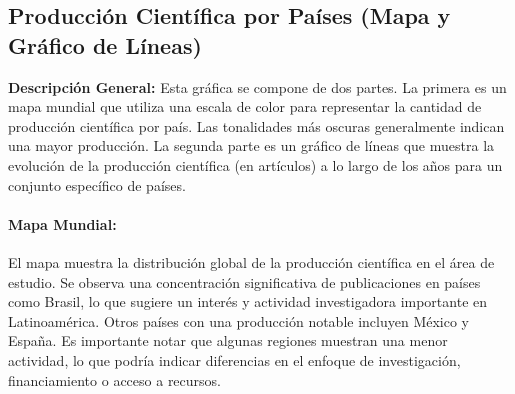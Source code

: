 \subsection{Producción Científica por Países (Mapa y Gráfico de Líneas) }
 
 \textbf{Descripción General:} Esta gráfica se compone de dos partes. La primera es un mapa mundial que utiliza una escala de color para representar la cantidad de producción científica por país. Las tonalidades más oscuras generalmente indican una mayor producción. La segunda parte es un gráfico de líneas que muestra la evolución de la producción científica (en artículos) a lo largo de los años para un conjunto específico de países. 
\paragraph{Mapa Mundial:}
El mapa muestra la distribución global de la producción científica en el área de estudio. Se observa una concentración significativa de publicaciones en países como Brasil, lo que sugiere un interés y actividad investigadora importante en Latinoamérica. Otros países con una producción notable incluyen México y España. Es importante notar que algunas regiones muestran una menor actividad, lo que podría indicar diferencias en el enfoque de investigación, financiamiento o acceso a recursos. 